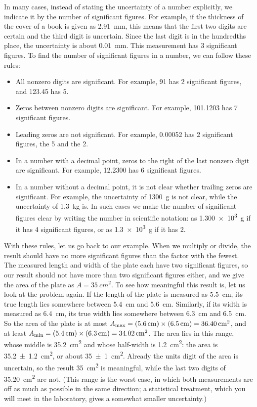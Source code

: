 \documentclass[11pt,a4paper]{article}
\begin{document}
In many cases, instead of stating the uncertainty of a number explicitly, we indicate it by the
number of significant figures. For example, if the thickness of the cover of a book is given as
\qty{2.91}{mm}, this means that the first two digits are certain and the third digit is uncertain.
Since the last digit is in the hundredths place, the uncertainty is about \qty{0.01}{mm}. This
measurement has 3 significant figures. To find the number of significant figures in a number, we
can follow these rules:
\begin{itemize}
  \item All nonzero digits are significant. For example, 91 has 2 significant figures, and 123.45
    has 5.
  \item Zeros between nonzero digits are significant. For example, 101.1203 has 7 significant
    figures.
  \item Leading zeros are not significant. For example, 0.00052 has 2 significant figures, the 5
    and the 2.
  \item In a number with a decimal point, zeros to the right of the last nonzero digit are
    significant. For example, 12.2300 has 6 significant figures.
  \item In a number without a decimal point, it is not clear whether trailing zeros are
    significant. For example, the uncertainty of \qty{1300}{g} is not clear, while the uncertainty
    of \qty{1.3}{kg} is. In such cases we make the number of significant figures clear by writing
    the number in scientific notation: as \qty{1.300e3}{g} if it has 4 significant figures, or as
    \qty{1.3e3}{g} if it has 2.
\end{itemize}

With these rules, let us go back to our example. When we multiply or divide, the result should
have no more significant figures than the factor with the fewest. The measured length and width of
the plate each have two significant figures, so our result should not have more than two
significant figures either, and we give the area of the plate as $A = \qty{35}{cm^2}$. To see how
meaningful this result is, let us look at the problem again. If the length of the plate is measured
as \qty{5.5}{cm}, its true length lies somewhere between \qty{5.4}{cm} and \qty{5.6}{cm}.
Similarly, if its width is measured as \qty{6.4}{cm}, its true width lies somewhere between
\qty{6.3}{cm} and \qty{6.5}{cm}. So the area of the plate is at most
$A_{\mathrm{max}} = (\qty{5.6}{cm}) \times (\qty{6.5}{cm}) = \qty{36.40}{cm^2}$, and at least
$A_{\mathrm{min}} = (\qty{5.4}{cm}) \times (\qty{6.3}{cm}) = \qty{34.02}{cm^2}$. The area lies in this
range, whose middle is \qty{35.2}{cm^2} and whose half-width is \qty{1.2}{cm^2}: the area is
\qty{35.2 \pm 1.2}{cm^2}, or about \qty{35 \pm 1}{cm^2}. Already the units digit of the area is
uncertain, so the result \qty{35}{cm^2} is meaningful, while the last two digits of
\qty{35.20}{cm^2} are not. (This range is the worst case, in which both measurements are off as
much as possible in the same direction; a statistical treatment, which you will meet in the
laboratory, gives a somewhat smaller uncertainty.)
\end{document}
